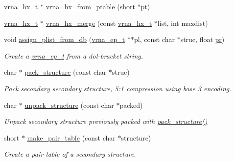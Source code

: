 \begin{DoxyCompactItemize}
\item 
\mbox{\hyperlink{group__struct__utils_ga877363f3a1703b53ecd025c6fcf897a0}{vrna\+\_\+hx\+\_\+t}} $\ast$ \mbox{\hyperlink{group__struct__utils_ga7ca60670fbbf23ae2ac9f63e5dbf8aef}{vrna\+\_\+hx\+\_\+from\+\_\+ptable}} (short $\ast$pt)
\item 
\mbox{\hyperlink{group__struct__utils_ga877363f3a1703b53ecd025c6fcf897a0}{vrna\+\_\+hx\+\_\+t}} $\ast$ \mbox{\hyperlink{group__struct__utils_ga2fdaac8bb6c239c119ad5c20b145b7f2}{vrna\+\_\+hx\+\_\+merge}} (const \mbox{\hyperlink{group__struct__utils_ga877363f3a1703b53ecd025c6fcf897a0}{vrna\+\_\+hx\+\_\+t}} $\ast$list, int maxdist)
\item 
void \mbox{\hyperlink{group__struct__utils_gab61df77cf7949cd516181fce0c3d7d78}{assign\+\_\+plist\+\_\+from\+\_\+db}} (\mbox{\hyperlink{group__struct__utils_gab9ac98ab55ded9fb90043b024b915aca}{vrna\+\_\+ep\+\_\+t}} $\ast$$\ast$pl, const char $\ast$struc, float \mbox{\hyperlink{fold__vars_8h_ac98ec419070aee6831b44e5c700f090f}{pr}})
\begin{DoxyCompactList}\small\item\em Create a \mbox{\hyperlink{group__struct__utils_gab9ac98ab55ded9fb90043b024b915aca}{vrna\+\_\+ep\+\_\+t}} from a dot-\/bracket string. \end{DoxyCompactList}\item 
char $\ast$ \mbox{\hyperlink{group__struct__utils_gac6dfa5e22928c087c6e09ff0054a7ced}{pack\+\_\+structure}} (const char $\ast$struc)
\begin{DoxyCompactList}\small\item\em Pack secondary secondary structure, 5\+:1 compression using base 3 encoding. \end{DoxyCompactList}\item 
char $\ast$ \mbox{\hyperlink{group__struct__utils_ga071c6921efe1eb974f115ee6fefa3c39}{unpack\+\_\+structure}} (const char $\ast$packed)
\begin{DoxyCompactList}\small\item\em Unpack secondary structure previously packed with \mbox{\hyperlink{group__struct__utils_gac6dfa5e22928c087c6e09ff0054a7ced}{pack\+\_\+structure()}} \end{DoxyCompactList}\item 
short $\ast$ \mbox{\hyperlink{group__struct__utils_ga89c32307ee50a0026f4a3131fac0845a}{make\+\_\+pair\+\_\+table}} (const char $\ast$structure)
\begin{DoxyCompactList}\small\item\em Create a pair table of a secondary structure. \end{DoxyCompactList}\item 
$$
\end{DoxyCompactItemize}
